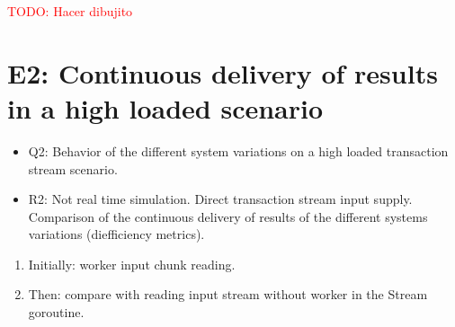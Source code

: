 \documentclass{article}
\begin{document}
\textcolor{red}{TODO: Hacer dibujito}

\section{E2: Continuous delivery of results in a high loaded scenario}

\begin{itemize}
  \item Q2: Behavior of the different system variations on a high loaded transaction stream scenario.
  \item R2: Not real time simulation. Direct transaction stream input supply. Comparison of the continuous delivery of results of the different systems variations (diefficiency metrics).
\end{itemize}


\begin{enumerate}

  \item Initially: worker input chunk reading.
  \item Then: compare with reading input stream without worker in the Stream goroutine.
\end{enumerate}



\cite{angles2008survey}

\end{document}
